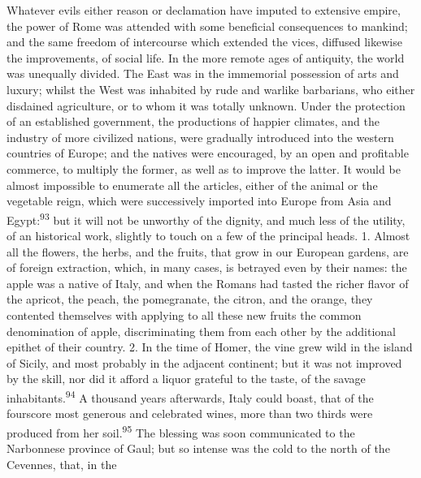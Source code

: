 

Whatever evils either reason or declamation have imputed to
extensive empire, the power of Rome was attended with some
beneficial consequences to mankind; and the same freedom of
intercourse which extended the vices, diffused likewise the
improvements, of social life. In the more remote ages of
antiquity, the world was unequally divided. The East was in the
immemorial possession of arts and luxury; whilst the West was
inhabited by rude and warlike barbarians, who either disdained
agriculture, or to whom it was totally unknown. Under the
protection of an established government, the productions of
happier climates, and the industry of more civilized nations,
were gradually introduced into the western countries of Europe;
and the natives were encouraged, by an open and profitable
commerce, to multiply the former, as well as to improve the
latter. It would be almost impossible to enumerate all the
articles, either of the animal or the vegetable reign, which were
successively imported into Europe from Asia and Egypt:\textsuperscript{93} but it
will not be unworthy of the dignity, and much less of the
utility, of an historical work, slightly to touch on a few of the
principal heads. 1. Almost all the flowers, the herbs, and the
fruits, that grow in our European gardens, are of foreign
extraction, which, in many cases, is betrayed even by their
names: the apple was a native of Italy, and when the Romans had
tasted the richer flavor of the apricot, the peach, the
pomegranate, the citron, and the orange, they contented
themselves with applying to all these new fruits the common
denomination of apple, discriminating them from each other by the
additional epithet of their country. 2. In the time of Homer, the
vine grew wild in the island of Sicily, and most probably in the
adjacent continent; but it was not improved by the skill, nor did
it afford a liquor grateful to the taste, of the savage
inhabitants.\textsuperscript{94} A thousand years afterwards, Italy could boast,
that of the fourscore most generous and celebrated wines, more
than two thirds were produced from her soil.\textsuperscript{95} The blessing was
soon communicated to the Narbonnese province of Gaul; but so
intense was the cold to the north of the Cevennes, that, in the
